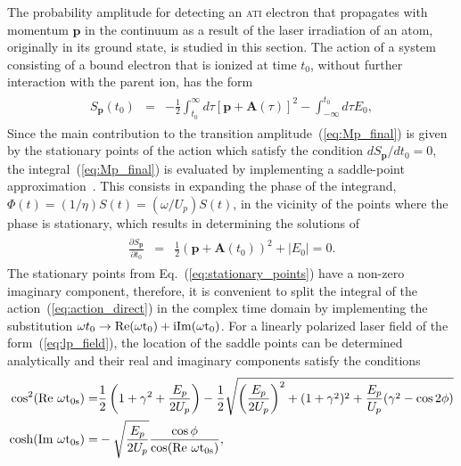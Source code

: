 The probability amplitude for detecting an \textsc{ati} electron that
propagates with momentum $\mathbf{p}$ in the continuum as a result of
the laser irradiation of an atom, originally in its ground state, is
studied in this section. The action of a system consisting of a bound
electron that is ionized at time $t_{0}$, without further interaction
with the parent ion, has the form~\cite{phd_Kopold,Becker_ati2002}
%
\begin{eqnarray}
  \label{eq:action_direct}
  \begin{split}
  S_{\mathbf{p}}(t_{0}) & = &
-\frac{1}{2}\int_{t_{0}}^{\infty}{d\tau [\mathbf{p} + \mathbf{A}(\tau)]^{2}}
- \int_{-\infty}^{t_{0}}{d\tau E_{0}},
\end{split}
\end{eqnarray}
%
Since the main contribution to the transition
amplitude~(\ref{eq:Mp_final}) is given by the stationary points of the
action which satisfy the condition $dS_{\mathbf{p}} / dt_{0} = 0$, the
integral~(\ref{eq:Mp_final}) is evaluated by implementing a
saddle-point approximation~\cite{spa_1960}. This consists in expanding
the phase of the integrand, $\Phi(t) = (1/\eta) S(t) = (\omega /
U_{p}) S(t)$, in the vicinity of the points where the phase is
stationary, which results in determining the solutions of
%
\begin{eqnarray}
  \label{eq:stationary_points}
  \begin{split}
    \frac{\partial S_{\mathbf{p}}}{\partial t_{0}} & = &
    \frac{1}{2} (\mathbf{p} + \mathbf{A}(t_{0}))^{2} + |E_{0}| = 0.
  \end{split}
\end{eqnarray}
%
The stationary points from Eq.~(\ref{eq:stationary_points}) have a
non-zero imaginary component, therefore, it is convenient to split the
integral of the action~(\ref{eq:action_direct}) in the complex time
domain by implementing the substitution $\omega t_{0} \to
\rm{Re}(\omega t_{0}) + i\rm{Im}(\omega t_{0})$. For a linearly
polarized laser field of the form~(\ref{eq:lp_field}), the location of
the saddle points can be determined analytically and their real and
imaginary components satisfy the conditions
%
\begin{eqnarray}
  \label{eq:ReIm_eqs}
  \begin{split}
    \cos^{2}(\rm{Re}\ \omega t_{0s}) = & \frac{1}{2}
    \left( 1 + \gamma^{2} + \frac{E_{p}}{2U_{p}} \right)
    - \frac{1}{2}\sqrt{\left( \frac{E_{p}}{2U_{p}} \right)^{2}
    + (1 + \gamma^2)^2 + \frac{E_{p}}{U_{p}}(\gamma^2 - \cos 2\phi)}
    \\
    \cosh(\rm{Im}\ \omega t_{0s}) = & - \sqrt{\frac{E_{p}}{2U_{p}}}
    \frac{\cos\phi}{\cos(\rm{Re}\ \omega t_{0s})},
  \end{split}
\end{eqnarray}
